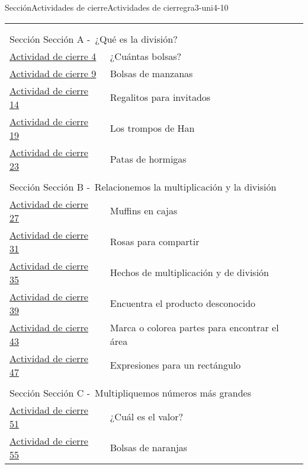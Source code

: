 \documentclass[twoside,10pt,]{article}
\begin{document}
\begin{sectionptx}{Sección}{Actividades de cierre}{}{Actividades de cierre}{}{}{gra3-uni4-10}
\noindent
\begin{longtable}[l]{ll}
\addtocounter{table}{-1}
\endfirsthead
\endhead
\multicolumn{2}{r}{(Continúa en la página siguiente)}\\
\endfoot
\endlastfoot
\multicolumn{2}{l}{\null}\\[1.5ex] \multicolumn{2}{l}{\large Sección  Sección A -~¿Qué es la división?}\\[0.5ex]
\hyperref[gra3-uni4-secA-lec1-cool-3]{Actividad de cierre 4}& ¿Cuántas bolsas?\\
\hyperref[gra3-uni4-secA-lec2-cool-3]{Actividad de cierre 9}& Bolsas de manzanas\\
\hyperref[gra3-uni4-secA-lec3-cool-3]{Actividad de cierre 14}& Regalitos para invitados\\
\hyperref[gra3-uni4-secA-lec4-cool-3]{Actividad de cierre 19}& Los trompos de Han\\
\hyperref[gra3-uni4-secA-lec5-cool-3]{Actividad de cierre 23}& Patas de hormigas\\
\multicolumn{2}{l}{\null}\\[1.5ex] \multicolumn{2}{l}{\large Sección  Sección B -~Relacionemos la multiplicación y la división}\\[0.5ex]
\hyperref[gra3-uni4-secB-lec6-cool-3]{Actividad de cierre 27}& Muffins en cajas\\
\hyperref[gra3-uni4-secB-lec7-cool-3]{Actividad de cierre 31}& Rosas para compartir\\
\hyperref[gra3-uni4-secB-lec8-cool-3]{Actividad de cierre 35}& Hechos de multiplicación y de división\\
\hyperref[gra3-uni4-secB-lec9-cool-3]{Actividad de cierre 39}& Encuentra el producto desconocido\\
\hyperref[gra3-uni4-secB-lec10-cool-3]{Actividad de cierre 43}& Marca o colorea partes para encontrar el área\\
\hyperref[gra3-uni4-secB-lec11-cool-3]{Actividad de cierre 47}& Expresiones para un rectángulo\\
\multicolumn{2}{l}{\null}\\[1.5ex] \multicolumn{2}{l}{\large Sección  Sección C -~Multipliquemos números más grandes}\\[0.5ex]
\hyperref[gra3-uni4-secC-lec12-cool-3]{Actividad de cierre 51}& ¿Cuál es el valor?\\
\hyperref[gra3-uni4-secC-lec13-cool-3]{Actividad de cierre 55}& Bolsas de naranjas\\

\end{longtable}
\end{sectionptx}
\end{document}
